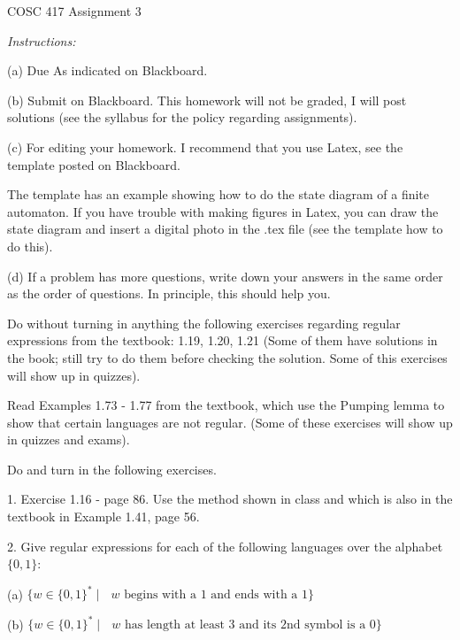 \documentclass[11pt]{article}
\begin{document}
{\Large COSC 417 \hspace{2cm} Assignment 3}
\vspace{0.5cm}

\emph{Instructions:}

(a) Due {As indicated on Blackboard.} 


(b) Submit on Blackboard.  This homework will not be graded, I will post solutions (see the syllabus for the policy regarding assignments).




		


 (c) For editing your homework. I recommend that you use Latex, see the template posted on Blackboard. 
 
         The template has an  example showing how to do the state diagram  of a finite automaton. If you have trouble with making figures in Latex, you can draw the state diagram and insert a digital photo in the .tex file (see the template how to do this).
  
	    
		   (d) If a problem has more questions, write down your answers in the same order as the order of questions. In principle, this should help you.
		   \vspace{0.5cm}
\bigskip




  Do without turning in anything the following exercises regarding regular expressions from the textbook: 1.19, 1.20, 1.21  (Some of them have solutions in the book; still try to do them before checking the solution. Some of this exercises will show up in quizzes).


  Read Examples 1.73 - 1.77  from the textbook, which use the Pumping lemma to show that certain languages are not regular. (Some of these exercises will show up in quizzes and exams).
\bigskip

Do and turn in the following exercises.

1.  Exercise 1.16  - page 86. Use the method shown in class and which is also in the textbook in Example 1.41, page 56.


\medskip

2.	Give regular expressions for each of the following languages over the alphabet $\{0,1\}$:

(a)	$\{w \in  \{0, 1\}^* \mid \mbox{ $w$ begins with a $1$ and ends with a $1$}\}$

(b)	$\{w  \in \{0, 1\}^*  \mid \mbox{ $w$ has length at least $3$ and its 2nd symbol is a $0$}\}$
\end{document}

